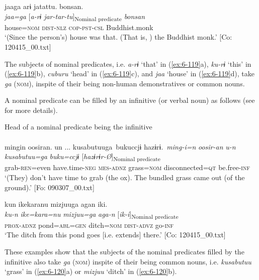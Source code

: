 \ex
{\TM}
\gll jaaga  arɨ  jatattu.  bonsan.\\
      \textit{jaa=ga}  [\textit{a-rɨ}  \textit{jar-tar-tu}]\textsubscript{Nominal predicate}  \textit{bonsan}\\
      house=\textsc{nom}  \textsc{dist}-\textsc{nlz}  \textsc{cop}-\textsc{pst}-\textsc{csl}  Buddhist.monk\\
\glt ‘(Since the person’s) house was that. (That is, ) the Buddhist monk.’ [Co: 120415\_00.txt]
\z

The subjects of nominal predicates, i.e. \textit{a-rɨ} ‘that’ in (\ref{ex:6-119}a), \textit{ku-rɨ} ‘this’ in (\ref{ex:6-119}b), \textit{cuburu} ‘head’ in (\ref{ex:6-119}c), and \textit{jaa} ‘house’ in (\ref{ex:6-119}d), take \textit{ga} (\textsc{nom}), inspite of their being non-human demonstratives or common nouns.

A nominal predicate can be filled by an infinitive (or verbal noun) as follows (see  for more details).

\ea\label{ex:6-120}
 Head of a nominal predicate being the infinitive\\

 \ea{}\\
{\TM}
\glll  mingin  oosiran.  un ...  kusabutuuga\    bukuccjɨ  hazɨrɨ.\
\textit{ming-i=n}  \textit{oosir-an}  \textit{u-n}  \textit{kusabutuu=ga}    \textit{buku=ccjɨ}  [\textit{hazɨrɨr-Ø}]\textsubscript{Nominal predicate}\\
grab-\textsc{ren}=even  have.time-\textsc{neg}  \textsc{mes}-\textsc{adnz}  grass=\textsc{nom}      disconnected=\textsc{qt}  be.free-\textsc{inf}\\
\glt ‘(They) don’t have time to grab (the ox). The bundled grass came out (of the ground).’ [Fo: 090307\_00.txt]
\z

\ex {\TM}  kun  {\textbar}ike{\textbar}karanu  mizjuuga  agan  iki.\\
\glll \textit{ku-n}  \textit{ike=kara=nu}  \textit{mizjuu=ga}  \textit{aga-n}  [\textit{ik-i}]\textsubscript{Nominal predicate}\\
\textsc{prox}-\textsc{adnz}  pond=\textsc{abl}=\textsc{gen}  ditch=\textsc{nom}  \textsc{dist}-\textsc{advz}  go-\textsc{inf}\\
\glt ‘The ditch from this pond goes [i.e. extends] there.’ [Co: 120415\_00.txt]
\z

These examples show that the subjects of the nominal predicates filled by the infinitive also take \textit{ga} (\textsc{nom}) inspite of their being common nouns, i.e. \textit{kusabutuu} ‘grass’ in (\ref{ex:6-120}a) or \textit{mizjuu} ‘ditch’ in (\ref{ex:6-120}b).

